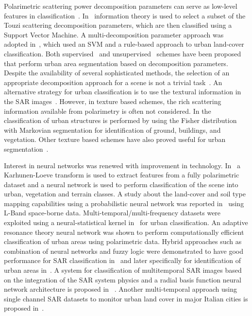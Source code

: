 Polarimetric scattering power decomposition parameters can serve as low-level features in classification~\cite{bhattacharya2015adaptive}. In~\cite{bhattacharya2012polarimetric} information theory is used to select a subset of the Touzi scattering decomposition parameters, which are then classified using a Support Vector Machine. A multi-decomposition parameter approach was adopted in~\cite{niu2013multi}, which used an SVM and a rule-based approach to urban land-cover classification. 
Both supervised~\cite{da2008land} and unsupervised~\cite{lee2004unsupervised} schemes have been proposed that perform urban area segmentation based on decomposition parameters. 
Despite the availability of several sophisticated methods, the selection of an appropriate decomposition approach for a scene is not a trivial task~\cite{chen2014modeling}. An alternative strategy for urban classification is to use the textural information  in the SAR images~\cite{1344157, 1183703}. However, in texture based schemes, the rich scattering information available from polarimetry is often not considered. 
In the classification of urban structures is performed by using the Fisher distribution with Markovian segmentation for identification of ground, buildings, and vegetation. Other texture based schemes have also proved useful for urban segmentation~\cite{1183703}. 

Interest in neural networks was renewed with improvement in technology. In~\cite{214928} a Karhunen-Loeve transform is used to extract features from a fully polarimetric dataset and a neural network is used to perform classification of the scene into urban, vegetation and terrain classes.   A study about the land-cover and soil type mapping capabilities using a probabilistic neural network was reported in~\cite{antropov2014land}  using L-Band space-borne data. Multi-temporal/multi-frequency datasets were exploited using a neural-statistical kernel in~\cite{1237401} for urban classification. An adaptive resonance theory neural network   was shown to perform computationally efficient classification of urban areas using polarimetric data. Hybrid approaches such as combination of neural networks and fuzzy logic were demonstrated to have good performance for SAR classification in~\cite{655339} and later specifically for identification of urban areas in~\cite{gamba2003increased}. A system for classification of multitemporal SAR images based on the integration of the SAR system physics and a radial basis function neural network architecture is proposed in ~\cite{4623140}. Another multi-temporal approach using single channel SAR datasets to monitor urban land cover in major Italian cities is proposed in~\cite{doi:10.1080/01431160118746}. 

